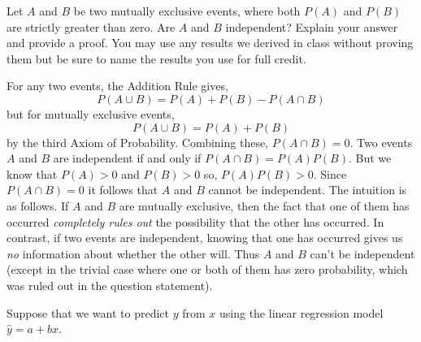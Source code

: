 \documentclass[addpoints,12pt]{exam}
\begin{document}
\begin{questions}
\question[10] Let $A$ and $B$ be two mutually exclusive events, where both $P(A)$ and $P(B)$ are strictly greater than zero. Are $A$ and $B$ independent? Explain your answer and provide a proof. You may use any results we derived in class without proving them but be sure to name the results you use for full credit.
			\begin{solution}[3in]
				For any two events, the Addition Rule gives,
					$$P(A\cup B) = P(A) + P(B) - P(A\cap B)$$
				but for mutually exclusive events,
					$$P(A \cup B) = P(A) + P(B)$$
				by the third Axiom of Probability. Combining these, $P(A \cap B) = 0$. Two events $A$ and $B$ are independent if and only if $P(A\cap B) = P(A)P(B)$. But we know that $P(A)>0$ and $P(B)>0$ so, $P(A)P(B)>0$. Since $P(A\cap B)=0$ it follows that $A$ and $B$ cannot be independent. The intuition is as follows.  If $A$ and $B$ are mutually exclusive, then the fact that one of them has occurred \emph{completely rules out} the possibility that the other has occurred. In contrast, if two events are independent, knowing that one has occurred gives us \emph{no} information about whether the other will. Thus $A$ and $B$ can't be independent (except in the trivial case where one or both of them has zero probability, which was ruled out in the question statement).
			\end{solution}


\question
	Suppose that we want to predict $y$ from $x$ using the linear regression model $\widehat{y} = a + bx$.




\end{questions}
\end{document}
